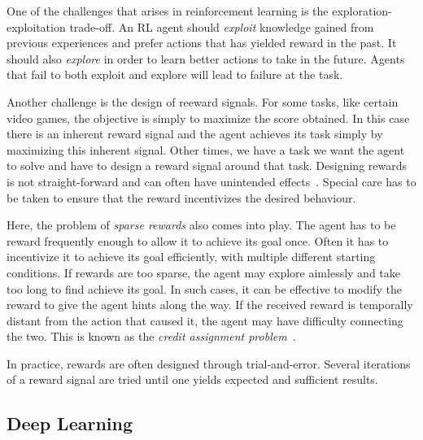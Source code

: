 
One of the challenges that arises in reinforcement learning is the exploration-exploitation trade-off.
An RL agent should \textit{exploit} knowledge gained from previous experiences and prefer actions that has yielded reward in the past.
It should also \textit{explore} in order to learn better actions to take in the future.
Agents that fail to both exploit and explore will lead to failure at the task.

Another challenge is the design of reeward signals.
For some tasks, like certain video games, the objective is simply to maximize the score obtained.
In this case there is an inherent reward signal and the agent achieves its task simply by maximizing this inherent signal.
Other times, we have a task we want the agent to solve and have to design a reward signal around that task.
Designing rewards is not straight-forward and can often have unintended effects~\cite{sutton_reinforcement_2018}.
Special care has to be taken to ensure that the reward incentivizes the desired behaviour.

Here, the problem of \textit{sparse rewards} also comes into play.
The agent has to be reward frequently enough to allow it to achieve its goal once.
Often it has to incentivize it to achieve its goal efficiently, with multiple different starting conditions.
If rewards are too sparse, the agent may explore aimlessly and take too long to find achieve its goal.
In such cases, it can be effective to modify the reward to give the agent hints along the way.
If the received reward is temporally distant from the action that caused it, the agent may have difficulty connecting the two.
This is known as the \textit{credit assignment problem}~\cite{minsky_cap_1961}.

In practice, rewards are often designed through trial-and-error.
Several iterations of a reward signal are tried until one yields expected and sufficient results.


\subsection{Deep Learning}

